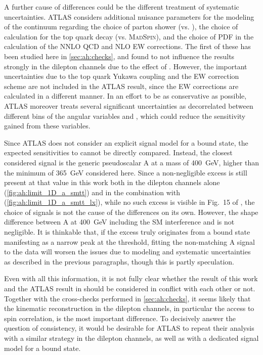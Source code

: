 A further cause of differences could be the different treatment of systematic uncertainties. ATLAS considers additional nuisance parameters for the modeling of the \ttbar continuum regarding the choice of parton shower (\pythia vs. \herwig), the choice of calculation for the top quark decay (\powheg vs. \textsc{MadSpin}), and the choice of PDF in the calculation of the NNLO QCD and NLO EW corrections. The first of these has been studied here in \cref{sec:ah:checks}, and found to not influence the results strongly in the dilepton channels due to the effect of \chel. However, the important uncertainties due to the top quark Yukawa coupling and the EW correction scheme are not included in the ATLAS result, since the EW corrections are calculated in a different manner. In an effort to be as conservative as possible, ATLAS moreover treats several significant uncertainties as decorrelated between different bins of the angular variables \cost and \dphill, which could reduce the sensitivity gained from these variables.

Since ATLAS does not consider an explicit signal model for a \ttbar bound state, the expected sensitivities to \etat cannot be directly compared. Instead, the closest considered signal is the generic pseudoscalar A at a mass of \SI{400}{\GeV}, higher than the minimum of \SI{365}{\GeV} considered here. Since a non-negligible excess is still present at that value in this work both in the dilepton channels alone (\cref{fig:ah:limit_1D_a_smtt}) and in the combination with \ljets (\cref{fig:ah:limit_1D_a_smtt_lx}), while no such excess is visible in Fig.~15 of , the choice of signals is not the cause of the differences on its own. However, the shape difference between A at \SI{400}{\GeV} including the SM interference and \etat is not negligible. It is thinkable that, if the excess truly originates from a \ttbar bound state manifesting as a narrow peak at the \ttbar threshold, fitting the non-matching A signal to the data will worsen the issues due to modeling and systematic uncertainties as described in the previous paragraphs, though this is partly speculation.

Even with all this information, it is not fully clear whether the result of this work and the ATLAS result in  should be considered in conflict with each other or not. Together with the cross-checks performed in \cref{sec:ah:checks}, it seems likely that the \ttbar kinematic reconstruction in the dilepton channels, in particular the access to spin correlation, is the most important difference. To decisively answer the question of consistency, it would be desirable for ATLAS to repeat their analysis with a similar strategy in the dilepton channels, as well as with a dedicated signal model for a \ttbar bound state.

